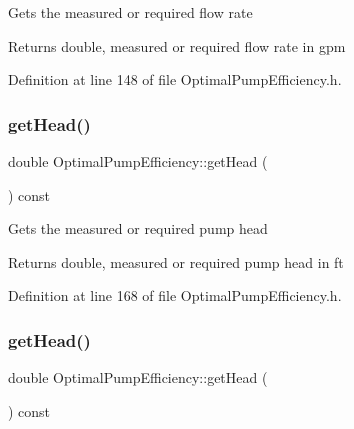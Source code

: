 Gets the measured or required flow rate

\begin{DoxyReturn}{Returns}
double, measured or required flow rate in gpm 
\end{DoxyReturn}


Definition at line 148 of file Optimal\+Pump\+Efficiency.\+h.

\mbox{\label{class_optimal_pump_efficiency_af31fdb10aabc197ff7536c9bbe006573}} 
\subsubsection{\texorpdfstring{get\+Head()}{getHead()}\hspace{0.1cm}{\footnotesize\ttfamily [1/3]}}
{\footnotesize\ttfamily double Optimal\+Pump\+Efficiency\+::get\+Head (\begin{DoxyParamCaption}{ }\end{DoxyParamCaption}) const\hspace{0.3cm}{\ttfamily [inline]}}

Gets the measured or required pump head

\begin{DoxyReturn}{Returns}
double, measured or required pump head in ft 
\end{DoxyReturn}


Definition at line 168 of file Optimal\+Pump\+Efficiency.\+h.

\mbox{\label{class_optimal_pump_efficiency_af31fdb10aabc197ff7536c9bbe006573}} 
\subsubsection{\texorpdfstring{get\+Head()}{getHead()}\hspace{0.1cm}{\footnotesize\ttfamily [2/3]}}
{\footnotesize\ttfamily double Optimal\+Pump\+Efficiency\+::get\+Head (\begin{DoxyParamCaption}{ }\end{DoxyParamCaption}) const\hspace{0.3cm}{\ttfamily [inline]}}

